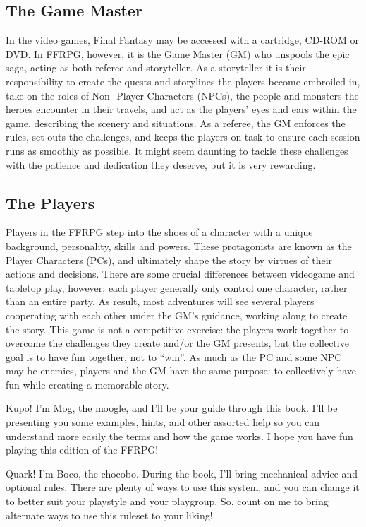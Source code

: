 \begin{multicols}{2}
\subsection{The Game Master}
In the video games, Final Fantasy may be
accessed with a cartridge, CD-ROM or DVD. In
FFRPG, however, it is the Game Master (GM) who
unspools the epic saga, acting as both referee and
storyteller. As a storyteller it is their responsibility
to create the quests and storylines the players
become embroiled in, take on the roles of Non-
Player Characters (NPCs), the people and
monsters the heroes encounter in their travels,
and act as the players' eyes and ears within the
game, describing the scenery and situations. As a
referee, the GM enforces the rules, set outs the
challenges, and keeps the players on task to ensure
each session runs as smoothly as possible. It might
seem daunting to tackle these challenges with the
patience and dedication they deserve, but it is very
rewarding.

\subsection{The Players}
Players in the FFRPG step into the shoes of a
character with a unique background, personality,
skills and powers. These protagonists are known
as the Player Characters (PCs), and ultimately
shape the story by virtues of their actions and
decisions. There are some crucial differences
between videogame and tabletop play, however;
each player generally only control one character,
rather than an entire party. As result, most
adventures will see several players cooperating
with each other under the GM's guidance, working
along to create the story. This game is not a
competitive exercise: the players work together to
overcome the challenges they create and/or the
GM presents, but the collective goal is to have fun
together, not to “win”. As much as the PC and some
NPC may be enemies, players and the GM have the
same purpose: to collectively have fun while
creating a memorable story.

\begin{mog}
Kupo! I'm Mog, the moogle, and I'll be your guide
through this book. I'll be presenting you some examples,
hints, and other assorted help so you can understand
more easily the terms and how the game works. I hope
you have fun playing this edition of the FFRPG!
\end{mog}

\begin{boco}
Quark! I'm Boco, the chocobo. During the
book, I'll bring mechanical advice and optional
rules. There are plenty of ways to use this system,
and you can change it to better suit your playstyle
and your playgroup. So, count on me to bring
alternate ways to use this ruleset to your liking!
\end{boco}
\end{multicols}

